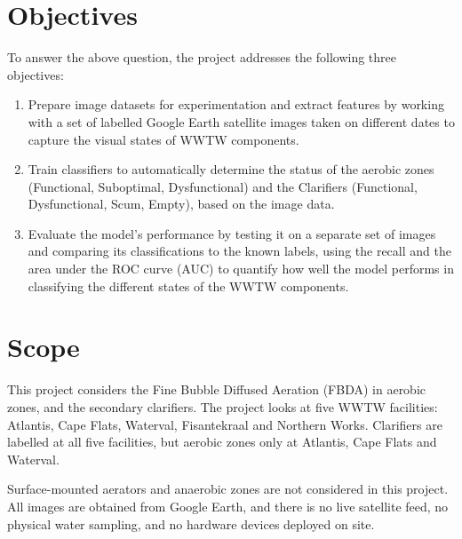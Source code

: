 \section{Objectives}
To answer the above question, the project addresses the following three objectives:

\begin{enumerate}
    \item Prepare image datasets for experimentation and extract features by working with a set of labelled Google Earth satellite images taken on different dates to capture the visual states of WWTW components.
    \item Train classifiers to automatically determine the status of the aerobic zones (Functional, Suboptimal, Dysfunctional) and the Clarifiers (Functional, Dysfunctional, Scum, Empty), based on the image data.
    \item Evaluate the model's performance by testing it on a separate set of images and comparing its classifications to the known labels, using the recall and the area under the ROC curve (AUC) to quantify how well the model performs in classifying the different states of the WWTW components.
\end{enumerate}

\section{Scope}
This project considers the Fine Bubble Diffused Aeration (FBDA) in aerobic zones, and the secondary clarifiers. The project looks at five WWTW facilities: Atlantis, Cape Flats, Waterval, Fisantekraal and Northern Works. Clarifiers are labelled at all five facilities, but aerobic zones only at Atlantis, Cape Flats and Waterval.

Surface-mounted aerators and anaerobic zones are not considered in this project. All images are obtained from Google Earth, and there is no live satellite feed, no physical water sampling, and no hardware devices deployed on site.

